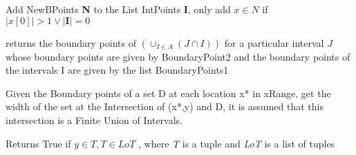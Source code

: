 \documentclass[letterpaper,10pt,english]{sphinxmanual}
\begin{document}

\begin{fulllineitems}
\label{Analisis/Auxiliaryfunctions:Auxiliaryfunctions.addPoints}
Add NewBPoints \textbf{N} to the List IntPoints \textbf{I}, only add \(x \in N\) if \(|x[0]|>1 \lor |\mathbf{I}| = 0\)

\end{fulllineitems}


\begin{fulllineitems}
\label{Analisis/Auxiliaryfunctions:Auxiliaryfunctions.findIntPoints}
returns the boundary points of \((\cup_{I \in A} (J \cap I))\) for a particular interval \(J\) whose boundary points are given by BoundaryPoint2 and the boundary points of the intervals I are given by the list BoundaryPoints1

\end{fulllineitems}


\begin{fulllineitems}
\label{Analisis/Auxiliaryfunctions:Auxiliaryfunctions.getCompPoints}
\end{fulllineitems}


\begin{fulllineitems}
\label{Analisis/Auxiliaryfunctions:Auxiliaryfunctions.getWidth}
Given the Boundary points of a set D at each location x* in xRange, get the width of the set at the Intersection of (x*,y) and D, it
is assumed that this intersection is a Finite Union of Intervals.

\end{fulllineitems}


\begin{fulllineitems}
\label{Analisis/Auxiliaryfunctions:Auxiliaryfunctions.inList}
Returns True if \(y \in T , T \in LoT\) , where \emph{T} is a tuple and \emph{LoT} is a list of tuples

\end{fulllineitems}
\end{document}
